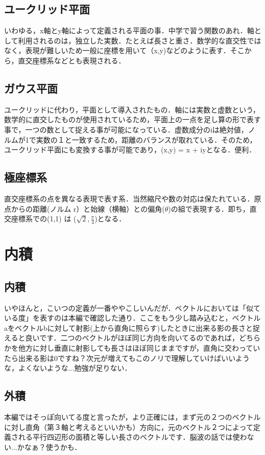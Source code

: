 \documentclass[11pt,a4paper]{jreport}
\begin{document}
\subsection{ユークリッド平面}
いわゆる，x軸とy軸によって定義される平面の事．中学で習う関数のあれ．軸として利用されるのは，独立した実数．たとえば長さと重さ．数学的な直交性ではなく，表現が難しいため一般に座標を用いて（x,y)などのように表す．そこから，直交座標系などとも表現される．
\subsection{ガウス平面}
ユークリッドに代わり，平面として導入されたもの．軸には実数と虚数という，数学的に直交したものが使用されているため，平面上の一点を足し算の形で表す事で，一つの数として捉える事が可能になっている．虚数成分のiは絶対値，ノルムが1で実数の１と一致するため，距離のバランスが取れている．そのため，ユークリッド平面にも変換する事が可能であり，(x,y) = x + iyとなる．便利．
\subsection{極座標系}
直交座標系の点を異なる表現で表す系．当然縮尺や数の対応は保たれている．原点からの距離(ノルム r）と始線（横軸）との偏角($\theta$)の組で表現する．即ち，直交座標系での(1,1) は ($\sqrt{2}, \frac{\pi}{4}$)となる．

\section{内積}
\subsection{内積}
いやほんと，こいつの定義が一番ややこしいんだが．ベクトルにおいては「似ている度」を表すのは本編で確認した通り．ここをもう少し踏み込むと，ベクトルaをベクトルbに対して射影(上から直角に照らす)したときに出来る影の長さと捉えると良いです．二つのベクトルがほぼ同じ方向を向いてるのであれば，どちらかを他方に対し垂直に射影しても長さはほぼ同じままですが，直角に交わっていたら出来る影は0ですね？次元が増えてもこのノリで理解していけばいいような，よくないような...勉強が足りない．
\subsection{外積}
本編ではそっぽ向いてる度と言ったが，より正確には，まず元の２つのベクトルに対し直角（第３軸と考えるといいかも）方向に，元のベクトル２つによって定義される平行四辺形の面積と等しい長さのベクトルです．脳波の話では使わない...かなぁ？使うかも．
\end{document}
